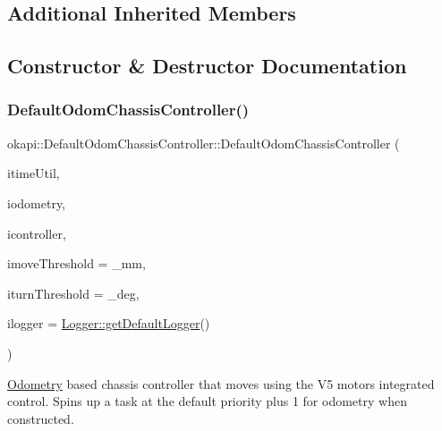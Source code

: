 \subsection*{Additional Inherited Members}


\subsection{Constructor \& Destructor Documentation}
\mbox{\label{classokapi_1_1DefaultOdomChassisController_a5fe023ef9ccab0532fd29d237bc91677}} 
\subsubsection{\texorpdfstring{DefaultOdomChassisController()}{DefaultOdomChassisController()}}
{\footnotesize\ttfamily okapi\+::\+Default\+Odom\+Chassis\+Controller\+::\+Default\+Odom\+Chassis\+Controller (\begin{DoxyParamCaption}\item[{const \mbox{\hyperlink{classokapi_1_1TimeUtil}{Time\+Util}} \&}]{itime\+Util,  }\item[{std\+::unique\+\_\+ptr$<$ \mbox{\hyperlink{classokapi_1_1Odometry}{Odometry}} $>$}]{iodometry,  }\item[{std\+::shared\+\_\+ptr$<$ \mbox{\hyperlink{classokapi_1_1ChassisController}{Chassis\+Controller}} $>$}]{icontroller,  }\item[{Q\+Length}]{imove\+Threshold = {\+\_\+mm},  }\item[{Q\+Angle}]{iturn\+Threshold = {\+\_\+deg},  }\item[{std\+::shared\+\_\+ptr$<$ \mbox{\hyperlink{classokapi_1_1Logger}{Logger}} $>$}]{ilogger = {\ttfamily \mbox{\hyperlink{classokapi_1_1Logger_a5053cf778b4b55acba788a3797dc96d2}{Logger\+::get\+Default\+Logger}}()} }\end{DoxyParamCaption})}

\mbox{\hyperlink{classokapi_1_1Odometry}{Odometry}} based chassis controller that moves using the V5 motor\textquotesingle{}s integrated control. Spins up a task at the default priority plus 1 for odometry when constructed.

